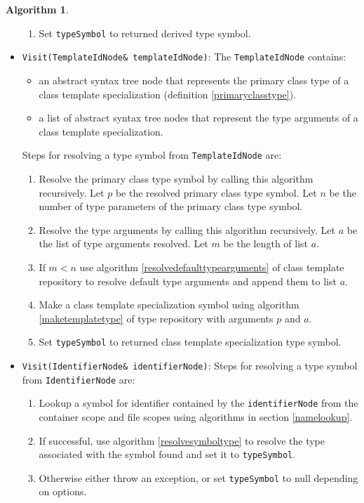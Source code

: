 \documentclass[a4paper,oneside,11pt]{book}
\theoremstyle{definition}
\newtheorem{algo}{Algorithm}[section]
\begin{document}
\begin{algo}
\begin{itemize}
\begin{enumerate}
\item
Set \verb|typeSymbol| to returned derived type symbol.
\end{enumerate}
\item
\verb|Visit(TemplateIdNode& templateIdNode)|:
The \verb|TemplateIdNode| contains:
\begin{itemize}
\item
an abstract syntax tree node that represents the primary class type of a class template specialization (definition \ref{primaryclasstype}).
\item
a list of abstract syntax tree nodes that represent the type arguments of a class template specialization.
\end{itemize}
Steps for resolving a type symbol from \verb|TemplateIdNode| are:
\begin{enumerate}
\item
Resolve the primary class type symbol by calling this algorithm recursively. Let $p$ be the resolved primary class type symbol.
Let $n$ be the number of type parameters of the primary class type symbol.
\item
Resolve the type arguments by calling this algorithm recursively. Let $a$ be the list of type arguments resolved. Let $m$ be the length of list $a$.
\item
If $m < n$ use algorithm \ref{resolvedefaulttypearguments} of class template repository to resolve default type arguments and append them to list $a$.
\item
Make a class template specialization symbol using algorithm \ref{maketemplatetype} of type repository with arguments $p$ and $a$.
\item
Set \verb|typeSymbol| to returned class template specialization type symbol.
\end{enumerate}
\item
\verb|Visit(IdentifierNode& identifierNode)|:
Steps for resolving a type symbol from \verb|IdentifierNode| are:
\begin{enumerate}
\item
Lookup a symbol for identifier contained by the \verb|identifierNode| from the container scope and file scopes using algorithms in section \ref{namelookup}.
\item
If successful, use algorithm \ref{resolvesymboltype} to resolve the type associated with the symbol found and set it to \verb|typeSymbol|.
\item
Otherwise either throw an exception, or set \verb|typeSymbol| to null depending on options.
\end{enumerate}

\end{itemize}
\end{algo}
\end{document}

